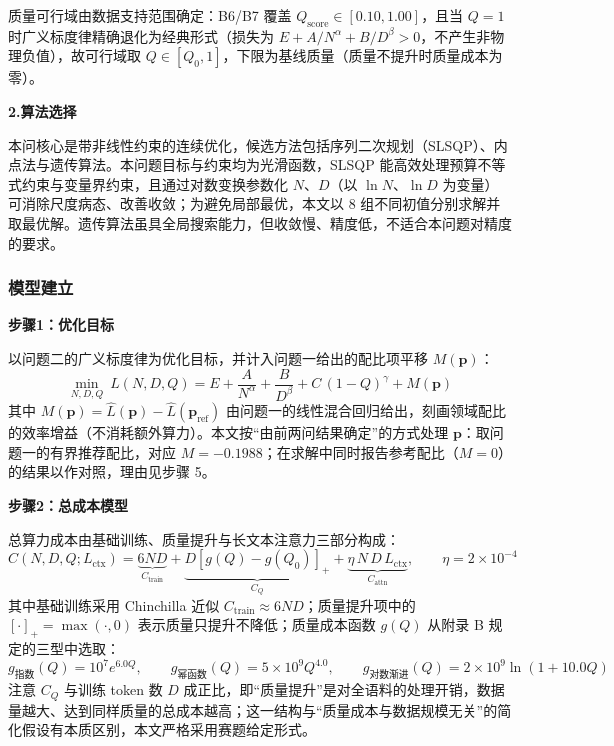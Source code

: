 质量可行域由数据支持范围确定：B6/B7 覆盖 $Q_{\text{score}}\in[0.10,1.00]$，且当 $Q=1$ 时广义标度律精确退化为经典形式（损失为 $E+A/N^{\alpha}+B/D^{\beta}>0$，不产生非物理负值），故可行域取 $Q\in[Q_0,1]$，下限为基线质量（质量不提升时质量成本为零）。

\textbf{2.算法选择}

本问核心是带非线性约束的连续优化，候选方法包括序列二次规划（SLSQP）、内点法与遗传算法。本问题目标与约束均为光滑函数，SLSQP 能高效处理预算不等式约束与变量界约束，且通过对数变换参数化 $N$、$D$（以 $\ln N$、$\ln D$ 为变量）可消除尺度病态、改善收敛；为避免局部最优，本文以 8 组不同初值分别求解并取最优解。遗传算法虽具全局搜索能力，但收敛慢、精度低，不适合本问题对精度的要求。

\subsubsection{模型建立}

\textbf{步骤1：优化目标}

以问题二的广义标度律为优化目标，并计入问题一给出的配比项平移 $M(\bm p)$：
\begin{equation}
    \min_{N,D,Q}\ L(N,D,Q) = E + \frac{A}{N^{\alpha}} + \frac{B}{D^{\beta}} + C\,(1-Q)^{\gamma} + M(\bm p)
\end{equation}
其中 $M(\bm p)=\hat L(\bm p)-\hat L(\bm p_{\text{ref}})$ 由问题一的线性混合回归给出，刻画领域配比的效率增益（不消耗额外算力）。本文按“由前两问结果确定”的方式处理 $\bm p$：取问题一的有界推荐配比，对应 $M=-0.1988$；在求解中同时报告参考配比（$M=0$）的结果以作对照，理由见步骤 5。

\textbf{步骤2：总成本模型}

总算力成本由基础训练、质量提升与长文本注意力三部分构成：
\begin{equation}
    C(N,D,Q;L_{\text{ctx}}) = \underbrace{6ND}_{C_{\text{train}}}
    + \underbrace{D\left[g(Q)-g(Q_0)\right]_{+}}_{C_Q}
    + \underbrace{\eta\,N\,D\,L_{\text{ctx}}}_{C_{\text{attn}}},
    \qquad \eta = 2\times10^{-4}
\end{equation}
其中基础训练采用 Chinchilla 近似 $C_{\text{train}}\approx 6ND$；质量提升项中的 $[\cdot]_+=\max(\cdot,0)$ 表示质量只提升不降低；质量成本函数 $g(Q)$ 从附录 B 规定的三型中选取：
\begin{equation}
    g_{\text{指数}}(Q)=10^{7}e^{6.0Q},\qquad
    g_{\text{幂函数}}(Q)=5\times10^{9}Q^{4.0},\qquad
    g_{\text{对数渐进}}(Q)=2\times10^{9}\ln(1+10.0Q)
\end{equation}
注意 $C_Q$ 与训练 token 数 $D$ 成正比，即“质量提升”是对全语料的处理开销，数据量越大、达到同样质量的总成本越高；这一结构与“质量成本与数据规模无关”的简化假设有本质区别，本文严格采用赛题给定形式。

